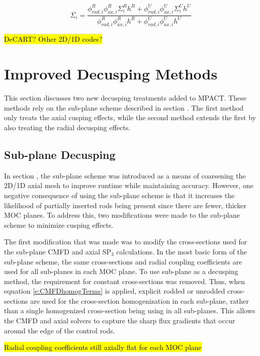 \begin{equation}\label{e:nTRACERdecusping}
\overline{\Sigma_i} = \frac{\phi_{rad,i}^R \phi_{ax,i}^R \Sigma_i^R h^R + \phi_{rad,i}^U \phi_{ax,i}^U \Sigma_i^U h^U}{\phi_{rad,i}^R \phi_{ax,i}^R h^R + \phi_{rad,i}^U \phi_{ax,i}^U h^U}
\end{equation}

\hl{DeCART?  Other 2D/1D codes?}

\section{Improved Decusping Methods}

This section discusses two new decusping treatments added to MPACT.  These methods rely on the sub-plane scheme described in section .  The first method only treats the axial cusping effects, while the second method extends the first by also treating the radial decusping effects.

\subsection{Sub-plane Decusping}

In section , the sub-plane scheme was introduced as a means of coarsening the 2D/1D axial mesh to improve runtime while maintaining accuracy.  However, one negative consequence of using the sub-plane scheme is that it increases the likelihood of partially inserted rods being present since there are fewer, thicker MOC planes.  To address this, two modifications were made to the sub-plane scheme to minimize cusping effects.

The first modification that was made was to modify the cross-sections used for the sub-plane CMFD and axial SP$_3$ calculations.  In the most basic form of the sub-plane scheme, the same cross-sections and radial coupling coefficients are used for all sub-planes in each MOC plane.  To use sub-plane as a decusping method, the requirement for constant cross-sections was removed.  Thus, when equation \ref{e:CMFDhomogTerms} is applied, explicit rodded or unrodded cross-sections are used for the cross-section homogenization in each sub-plane, rather than a single homogenized cross-section being using in all sub-planes.  This allows the CMFD and axial solvers to capture the sharp flux gradients that occur around the edge of the control rods.

\hl{Radial coupling coefficients still axially flat for each MOC plane}

